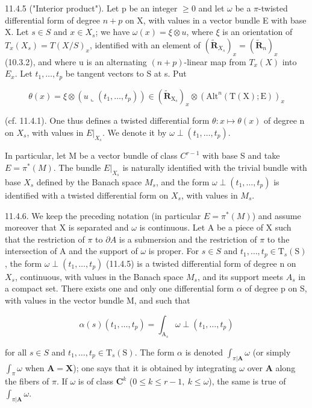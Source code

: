 11.4.5 ("Interior product"). Let p be an integer \(\geqslant 0\) and let \(\omega\) be a \(\pi\)-twisted differential form of degree \(n + p\) on X, with values in a vector bundle E with base X. Let \(s \in S\) and \(x \in X_s\); we have \(\omega(x) = \xi \otimes u\), where \(\xi\) is an orientation of \(T_x(X_s) = T(X/S)_x\), identified with an element of \((\tilde{\mathbf{R}}_{X_s})_x = (\tilde{\mathbf{R}}_n)_x\) (10.3.2), and where u is an alternating \((n + p)\)-linear map from \(T_x(X)\) into \(E_x\). Let \(t_1, \ldots, t_p\) be tangent vectors to S at s. Put

\[
\theta (x) = \xi \otimes (u \llcorner (t _ {1}, \dots , t _ {p})) \in (\tilde {\mathbf {R}} _ {\mathrm{X} _ {s}}) _ {x} \otimes (\mathrm{Alt} ^ {n} (\mathrm{T} (\mathrm{X}); \mathrm{E})) _ {x}
\]

(cf. 11.4.1). One thus defines a twisted differential form \(\theta: x \mapsto \theta(x)\) of degree n on \(X_s\), with values in \(E|_{X_{s}}\). We denote it by \(\omega \perp (t_1, \ldots, t_p)\).

In particular, let M be a vector bundle of class \(C^{r-1}\) with base S and take \(E = \pi^{*}(M)\). The bundle \(E|_{X_{s}}\) is naturally identified with the trivial bundle with base \(X_{s}\) defined by the Banach space \(M_{s}\), and the form \(\omega\perp(t_{1},\ldots,t_{p})\) is identified with a twisted differential form on \(X_{s}\), with values in \(M_{s}\).

11.4.6. We keep the preceding notation (in particular \(E=\pi^{*}(M)\)) and assume moreover that X is separated and \(\omega\) is continuous. Let A be a piece of X such that the restriction of \(\pi\) to \(\partial A\) is a submersion and the restriction of \(\pi\) to the intersection of A and the support of \(\omega\) is proper. For \(s \in S\) and \(t_{1},\ldots,t_{p}\in\mathrm{T}_{s}(\mathrm{S})\), the form \(\omega \perp (t_{1}, \ldots, t_{p})\) (11.4.5) is a twisted differential form of degree n on \(X_{s}\), continuous, with values in the Banach space \(M_{s}\), and its support meets \(A_{s}\) in a compact set. There exists one and only one differential form \(\alpha\) of degree p on S, with values in the vector bundle M, and such that

\[
\alpha (s) \left(t _ {1}, \dots , t _ {p}\right) = \int_ {\mathrm{A} _ {s}} \omega \perp \left(t _ {1}, \dots , t _ {p}\right)
\]

for all \(s \in S\) and \(t_{1},\ldots,t_{p}\in\mathrm{T}_{s}(\mathrm{S})\). The form \(\alpha\) is denoted \(\int_{\pi|\mathbf{A}} \omega\) (or simply \(\int_{\pi} \omega\) when \(\mathbf{A} = \mathbf{X}\)); one says that it is obtained by integrating \(\omega\) over \(\mathbf{A}\) along the fibers of \(\pi\). If \(\omega\) is of class \(\mathbf{C}^{k}\) (\(0\leqslant k\leqslant r-1,\ k\leqslant\omega\)), the same is true of \(\int_{\pi|\mathbf{A}} \omega\).

